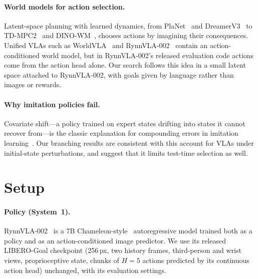 \documentclass{article}
\begin{document}
\paragraph{World models for action selection.} Latent-space planning with learned dynamics, from PlaNet~\citep{hafner2018planet} and DreamerV3~\citep{hafner2023dreamerv3} to TD-MPC2~\citep{hansen2023tdmpc2} and DINO-WM~\citep{zhou2024dinowm}, chooses actions by imagining their consequences. Unified VLAs such as WorldVLA~\citep{cen2025worldvla} and RynnVLA-002~\citep{cen2025rynnvla002} contain an action-conditioned world model, but in RynnVLA-002's released evaluation code actions come from the action head alone. Our search follows this idea in a small latent space attached to RynnVLA-002, with goals given by language rather than images or rewards.

\paragraph{Why imitation policies fail.} Covariate shift---a policy trained on expert states drifting into states it cannot recover from---is the classic explanation for compounding errors in imitation learning~\citep{ross2011dagger}. Our branching results are consistent with this account for VLAs under initial-state perturbations, and suggest that it limits test-time selection as well.

\section{Setup}
\label{sec:setup}

\paragraph{Policy (System~1).} RynnVLA-002~\citep{cen2025rynnvla002} is a 7B Chameleon-style~\citep{chameleon2024} autoregressive model trained both as a policy and as an action-conditioned image predictor. We use its released LIBERO-Goal checkpoint (256\,px, two history frames, third-person and wrist views, proprioceptive state, chunks of $H{=}5$ actions predicted by its continuous action head) unchanged, with its evaluation settings.
\end{document}
